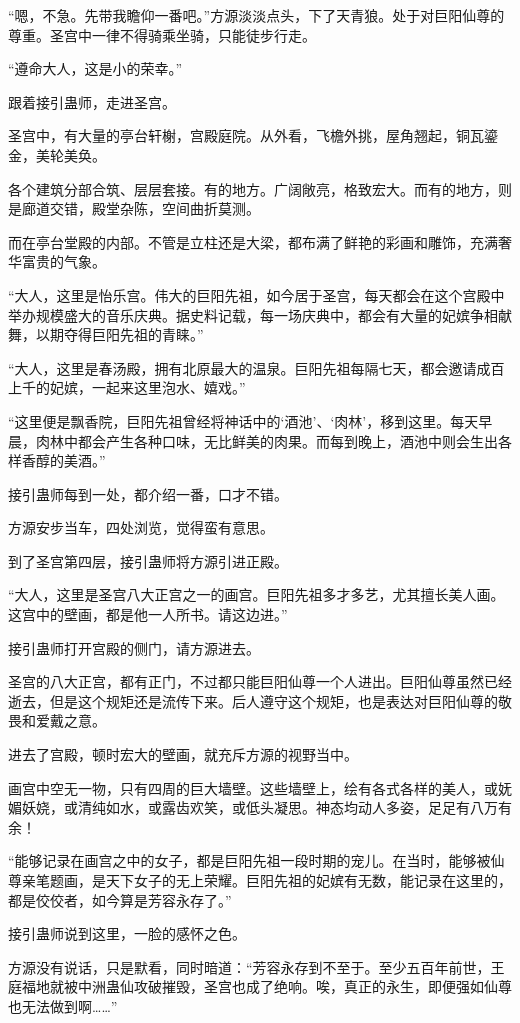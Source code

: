 \begin{this_body}
“嗯，不急。先带我瞻仰一番吧。”方源淡淡点头，下了天青狼。处于对巨阳仙尊的尊重。圣宫中一律不得骑乘坐骑，只能徒步行走。

“遵命大人，这是小的荣幸。”

跟着接引蛊师，走进圣宫。

圣宫中，有大量的亭台轩榭，宫殿庭院。从外看，飞檐外挑，屋角翘起，铜瓦鎏金，美轮美奂。

各个建筑分部合筑、层层套接。有的地方。广阔敞亮，格致宏大。而有的地方，则是廊道交错，殿堂杂陈，空间曲折莫测。

而在亭台堂殿的内部。不管是立柱还是大梁，都布满了鲜艳的彩画和雕饰，充满奢华富贵的气象。

“大人，这里是怡乐宫。伟大的巨阳先祖，如今居于圣宫，每天都会在这个宫殿中举办规模盛大的音乐庆典。据史料记载，每一场庆典中，都会有大量的妃嫔争相献舞，以期夺得巨阳先祖的青睐。”

“大人，这里是春汤殿，拥有北原最大的温泉。巨阳先祖每隔七天，都会邀请成百上千的妃嫔，一起来这里泡水、嬉戏。”

“这里便是飘香院，巨阳先祖曾经将神话中的‘酒池’、‘肉林’，移到这里。每天早晨，肉林中都会产生各种口味，无比鲜美的肉果。而每到晚上，酒池中则会生出各样香醇的美酒。”

接引蛊师每到一处，都介绍一番，口才不错。

方源安步当车，四处浏览，觉得蛮有意思。

到了圣宫第四层，接引蛊师将方源引进正殿。

“大人，这里是圣宫八大正宫之一的画宫。巨阳先祖多才多艺，尤其擅长美人画。这宫中的壁画，都是他一人所书。请这边进。”

接引蛊师打开宫殿的侧门，请方源进去。

圣宫的八大正宫，都有正门，不过都只能巨阳仙尊一个人进出。巨阳仙尊虽然已经逝去，但是这个规矩还是流传下来。后人遵守这个规矩，也是表达对巨阳仙尊的敬畏和爱戴之意。

进去了宫殿，顿时宏大的壁画，就充斥方源的视野当中。

画宫中空无一物，只有四周的巨大墙壁。这些墙壁上，绘有各式各样的美人，或妩媚妖娆，或清纯如水，或露齿欢笑，或低头凝思。神态均动人多姿，足足有八万有余！

“能够记录在画宫之中的女子，都是巨阳先祖一段时期的宠儿。在当时，能够被仙尊亲笔题画，是天下女子的无上荣耀。巨阳先祖的妃嫔有无数，能记录在这里的，都是佼佼者，如今算是芳容永存了。”

接引蛊师说到这里，一脸的感怀之色。

方源没有说话，只是默看，同时暗道：“芳容永存到不至于。至少五百年前世，王庭福地就被中洲蛊仙攻破摧毁，圣宫也成了绝响。唉，真正的永生，即便强如仙尊也无法做到啊……”


\end{this_body}
